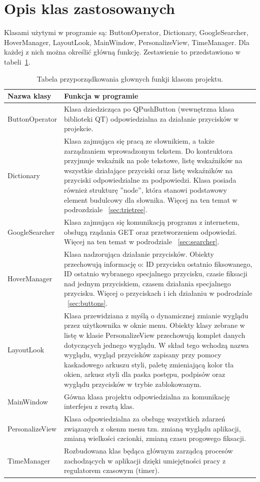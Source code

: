 \documentclass[twoside,a4paper]{book}
\begin{document}
\section{Opis klas zastosowanych}\label{sec:klas}
Klasami użytymi w programie są: ButtonOperator, Dictionary, GoogleSearcher, HoverManager, LayoutLook, MainWindow, PersonalizeView, TimeManager. Dla każdej z nich można określić główną funkcję. Zestawienie to przedstawiono w tabeli~\ref{table:classTab}.
\begin{table}
\renewcommand\arraystretch{1.5}
 \centering
    \begin{tabular}{|>{\centering\arraybackslash}m{4cm}|m{8.5cm}|}
     \hline
    \textbf{Nazwa klasy} & \textbf{Funkcja w programie}\\ \hline
     ButtonOperator& Klasa dziedzicząca po QPushButton (wewnętrzna klasa biblioteki QT) odpowiedzialna za działanie przycisków w projekcie.\\ \hline 
     Dictionary & Klasa zajmująca się pracą ze słownikiem, a także zarządzaniem wprowadzonym tekstem. Do kontruktora przyjmuje wskaźnik na pole tekstowe, listę wskaźników na wszystkie działające przyciski oraz listę wskaźników na przyciski odpowiedzialne za podpowiedzi. Klasa posiada również strukturę ''node'', która stanowi podstawowy element budulcowy dla słownika. Więcej na ten temat w podrozdziale ~\ref{sec:trietree}.  \\ \hline
     GoogleSearcher & Klasa zajmująca się komunikacją programu z internetem, obsługą rządania GET oraz przetworzeniem odpowiedzi. Więcej na ten temat w podrodziale ~\ref{sec:searcher}.\\ \hline
     HoverManager& Klasa nadzorująca działanie przycisków. Obiekty przechowują informację o: ID przycisku ostatnio fiksowanego, ID ostatnio wybranego specjalnego przycisku, czasie fiksacji nad jednym przyciskiem, czasem działania specjalnego przycisku. Więcej o przyciskach i ich działaniu w podrodziale ~\ref{sec:buttons}.\\ \hline
     LayoutLook& Klasa przewidziana z myślą o dynamicznej zmianie wyglądu przez użytkownika w oknie menu. Obiekty klasy zebrane w listę w klasie PersonalizeView przechowują komplet danych dotyczących jednego wyglądu. W skład tego wchodzą nazwa wyglądu, wygląd przycisków zapisany przy pomocy kaskadowego arkuszu styli, paletę zmieniającą kolor tła okien, arkusz styli dla paska postępu, podpisów oraz wyglądu przycisków w trybie zablokowanym.\\ \hline
     MainWindow& Gówna klasa projektu odpowiedzialna za komunikację interfejsu z resztą klas.\\ \hline
     PersonalizeView & Klasa odpowiedzialna za obsługę wszystkich zdarzeń związanych z okenm menu tzn. zmianą wyglądu aplikacji, zmianą wielkości czcionki, zmianą czasu progowego fiksacji.\\ \hline
     TimeManager & Rozbudowana klas będąca głównym zarządcą procesów zachodzących w aplikacji dzięki umiejętności pracy z regulatorem czasowym (timer). \\ \hline 
    
	\end{tabular}
	 \caption{Tabela przyporządkowania głownych funkji klasom projektu.} 
    \label{table:classTab}
\end{table}
\end{document}

